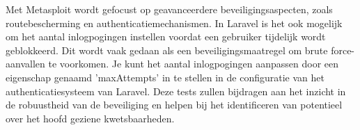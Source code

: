 Met Metasploit wordt gefocust op geavanceerdere beveiligingsaspecten, zoals routebescherming en authenticatiemechanismen.
In Laravel is het ook mogelijk om het aantal inlogpogingen instellen voordat een gebruiker tijdelijk wordt geblokkeerd. Dit wordt vaak gedaan 
als een beveiligingsmaatregel om brute force-aanvallen te voorkomen. Je kunt het aantal inlogpogingen aanpassen door een eigenschap genaamd 
'maxAttempts' in te stellen in de configuratie van het authenticatiesysteem van Laravel. Deze tests zullen 
bijdragen aan het inzicht in de robuustheid van de beveiliging en helpen bij het identificeren van potentieel over het hoofd geziene kwetsbaarheden.
